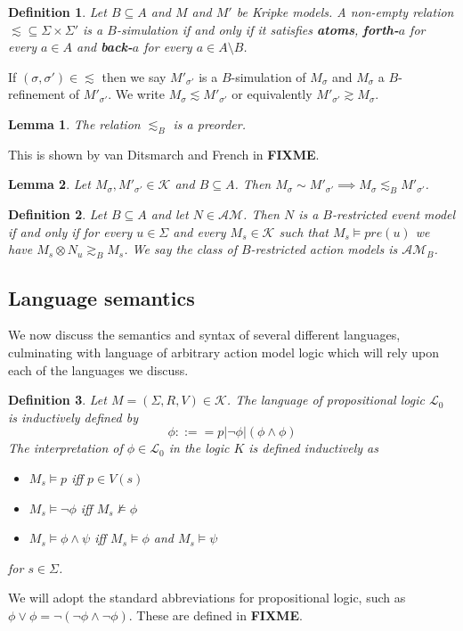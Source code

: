 \documentclass[12pt, a4paper, titlepage]{article}
\newtheorem{defn}{Definition}[subsection]
\newtheorem{lemma}{Lemma}[subsection]
\numberwithin{equation}{section}
\newcommand{\lang}{\mathcal{L}}
\newcommand{\langProp}{\lang_0}
\newcommand{\kripkeClass}{\mathcal{K}}
\newcommand{\eventClass}{\mathcal{AM}}
\newcommand{\FIXME}{{\bf FIXME}}
\begin{document}
\begin{defn} \label{refinement}
Let $B \subseteq A$ and $M$ and $M'$ be Kripke models. A non-empty relation $\lesssim \subseteq \Sigma
\times \Sigma'$ is a $B$-simulation if and only if it satisfies {\bf atoms}, {\bf forth-$a$} for
every $a \in A$ and {\bf back-$a$} for every $a \in A \setminus B$.
\end{defn}
If $(\sigma, \sigma') \in \lesssim$ then we say $M'_{\sigma'}$ is a $B$-simulation of $M_\sigma$ and
$M_\sigma$ a $B$-refinement of $M'_{\sigma'}$.
We write $M_{\sigma} \lesssim M'_{\sigma'}$ or equivalently $M'_{\sigma'} \gtrsim M_{\sigma}$.

\begin{lemma} \label{refinementPreorder}
The relation $\lesssim_B$ is a preorder.
\end{lemma}
This is shown by van Ditsmarch and French in \FIXME.

\begin{lemma} \label{bisimilarIsRefinement}
Let $M_\sigma, M'_{\sigma'} \in \kripkeClass$ and $B \subseteq A$.
Then $M_\sigma \sim M'_{\sigma'} \implies M_\sigma \lesssim_B M'_{\sigma'}$.
\end{lemma}

\begin{defn} \label{brestrict}
Let $B \subseteq A$ and let $N \in \eventClass$. Then $N$ is a $B$-restricted event model if and
only if for every $u \in \Sigma$ and every $M_s \in \kripkeClass$ such that $M_s \models pre(u)$ we
have $M_s \otimes N_u \gtrsim_B M_s$.
We say the class of $B$-restricted action models is $\eventClass_B$.
\end{defn}

\subsection{Language semantics}
We now discuss the semantics and syntax of several different languages, culminating with language of
arbitrary action model logic which will rely upon each of the languages we discuss.

\begin{defn} \label{propLogic}
Let $M = (\Sigma, R, V) \in \kripkeClass$.
The language of propositional logic $\langProp$ is inductively defined by
\[
	\phi ::== p | \neg \phi | (\phi \land \phi)
\]
The interpretation of $\phi \in \langProp$ in the logic $K$ is defined inductively as
\begin{itemize}
	\item $M_s \models p$ iff $p \in V(s)$
	\item $M_s \models \neg \phi$ iff $M_s \not \models \phi$
	\item $M_s \models \phi \land \psi$ iff $M_s \models \phi$ and $M_s \models \psi$
\end{itemize}
for $s \in \Sigma$.
\end{defn}
We will adopt the standard abbreviations for propositional logic, such as $\phi \lor \phi =
\neg(\neg \phi \land \neg \phi)$.
These are defined in \FIXME.
\end{document}
